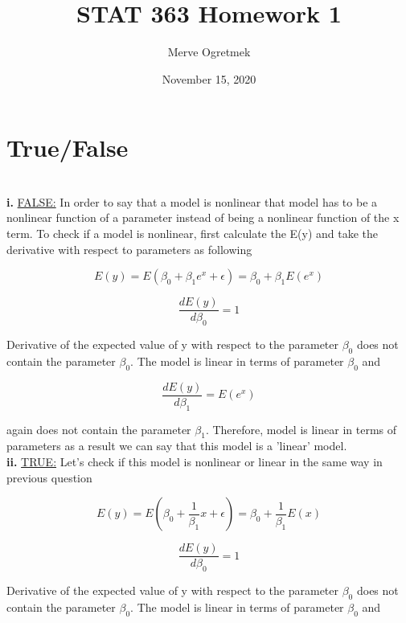 \documentclass{article}
\title{STAT 363 Homework 1}
\author{Merve Ogretmek}
\date{November 15, 2020}
\begin{document}
\maketitle

\section{True/False}
\\

\textbf{i.} \underline{FALSE:} In order to say that a model is nonlinear that model has to be a nonlinear function of a parameter instead of being a nonlinear function of the x term. To check if a model is nonlinear, first calculate the E(y) and take the derivative with respect to parameters as following 

\begin{equation}
E(y) = E(\beta_0 + \beta_1e^x + \epsilon) = \beta_0 + \beta_1E(e^x) 
\end{equation}

\begin{equation}
\frac{dE(y)}{d\beta_0} = 1
\end{equation}

Derivative of the expected value of y with respect to the parameter $\beta_0$ does not contain the parameter $\beta_0$. The model is linear in terms of parameter $\beta_0$ and 

\begin{equation}
\frac{dE(y)}{d\beta_1} = E(e^x)
\end{equation}

again does not contain the parameter $\beta_1$. Therefore, model is linear in terms of parameters as a result we can say that this model is a 'linear' model. 
\\

\textbf{ii.} \underline{TRUE:} Let's check if this model is nonlinear or linear in the same way in previous question

\begin{equation}
E(y) = E(\beta_0 + \frac{1}{\beta_1}x + \epsilon) = \beta_0 + \frac{1}{\beta_1}E(x) 
\end{equation}

\begin{equation}
\frac{dE(y)}{d\beta_0} = 1
\end{equation}

Derivative of the expected value of y with respect to the parameter $\beta_0$ does not contain the parameter $\beta_0$. The model is linear in terms of parameter $\beta_0$ and 
\end{document}
